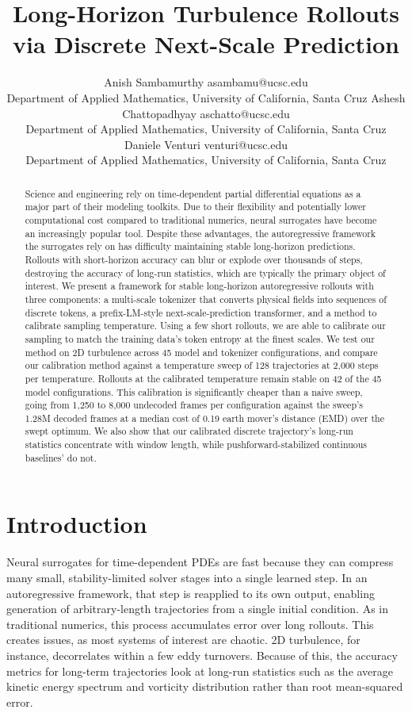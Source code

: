 \documentclass{article}
\title{Long-Horizon Turbulence Rollouts via Discrete Next-Scale Prediction}
\author{\name Anish Sambamurthy \email asambamu@ucsc.edu \\
        \addr Department of Applied Mathematics, University of California, Santa Cruz
        \AND
        \name Ashesh Chattopadhyay \email aschatto@ucsc.edu \\
        \addr Department of Applied Mathematics, University of California, Santa Cruz
        \AND
        \name Daniele Venturi \email venturi@ucsc.edu \\
        \addr Department of Applied Mathematics, University of California, Santa Cruz}
\begin{document}
\maketitle

\begin{abstract}
Science and engineering rely on time-dependent partial differential equations
as a major part of their modeling toolkits. Due to their flexibility and potentially
lower computational cost compared to traditional numerics, neural surrogates have
become an increasingly popular tool. Despite these advantages, the autoregressive
framework the surrogates rely on has difficulty maintaining stable long-horizon
predictions. Rollouts with short-horizon accuracy can blur or explode over thousands of
steps, destroying the accuracy of long-run statistics, which are typically the primary object of 
interest. We present a framework for stable long-horizon autoregressive
rollouts with three components: a multi-scale tokenizer that converts physical fields into
sequences of discrete tokens, a prefix-LM-style next-scale-prediction transformer,
and a method to calibrate sampling temperature. Using a few short rollouts, we are able to calibrate our sampling to match the training data's token entropy at the finest scales. We test our method
on 2D turbulence across 45 model and tokenizer configurations, and compare our 
calibration method against a temperature sweep of 128 trajectories at 2{,}000 
steps per temperature. Rollouts at the calibrated temperature remain stable on 42 of the 45 model configurations.
This calibration is significantly cheaper than a naive sweep, going from 1{,}250 to 8{,}000 undecoded frames per
configuration against the sweep's 1.28M decoded frames at a median cost of 0.19 earth mover's distance (EMD) over
the swept optimum. We also show that our calibrated discrete trajectory's long-run statistics concentrate
with window length, while pushforward-stabilized continuous baselines' do not.


\end{abstract}

\section{Introduction}
\label{sec:intro}

Neural surrogates for time-dependent PDEs are fast because they can compress many small, stability-limited solver stages
into a single learned step. In an autoregressive framework, that step is reapplied to its own output, enabling generation of
arbitrary-length trajectories from a single initial condition. As in traditional numerics, this process
accumulates error over long rollouts. This creates issues, as most systems of interest are chaotic. 2D turbulence,
for instance, decorrelates within a few eddy turnovers. Because of this, the accuracy metrics for long-term trajectories look
at long-run statistics such as the average kinetic energy spectrum and vorticity distribution rather than root mean-squared error.
\end{document}
